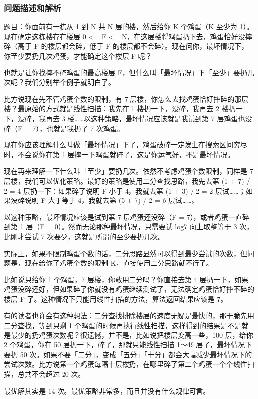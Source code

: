 \documentclass[12pt]{article}
\begin{document}
\subsubsection{问题描述和解析}
题目：你面前有一栋从 1 到 N 共 N 层的楼，然后给你 K 个鸡蛋（K 至少为 1）。现在确定这栋楼存在楼层 0 <= F <= N，在这层楼将鸡蛋扔下去，鸡蛋恰好没摔碎（高于 F 的楼层都会碎，低于 F 的楼层都不会碎）。现在问你，最坏情况下，你至少要扔几次鸡蛋，才能确定这个楼层 F 呢？

也就是让你找摔不碎鸡蛋的最高楼层 F，但什么叫「最坏情况」下「至少」要扔几次呢？我们分别举个例子就明白了。

比方说现在先不管鸡蛋个数的限制，有 7 层楼，你怎么去找鸡蛋恰好摔碎的那层楼？最原始的方式就是线性扫描：我先在 1 楼扔一下，没碎，我再去 2 楼扔一下，没碎，我再去 3 楼……以这种策略，最坏情况应该就是我试到第 7 层鸡蛋也没碎（F = 7），也就是我扔了 7 次鸡蛋。

现在你应该理解什么叫做「最坏情况」下了，鸡蛋破碎一定发生在搜索区间穷尽时，不会说你在第 1 层摔一下鸡蛋就碎了，这是你运气好，不是最坏情况。

现在再来理解一下什么叫「至少」要扔几次。依然不考虑鸡蛋个数限制，同样是 7 层楼，我们可以优化策略。最好的策略是使用二分查找思路，我先去第 (1 + 7) / 2 = 4 层扔一下：如果碎了说明 F 小于 4，我就去第 (1 + 3) / 2 = 2 层试……；如果没碎说明 F 大于等于 4，我就去第 (5 + 7) / 2 = 6 层试……。

以这种策略，最坏情况应该是试到第 7 层鸡蛋还没碎（F = 7），或者鸡蛋一直碎到第 1 层（F = 0）。然而无论那种最坏情况，只需要试 log7 向上取整等于 3 次，比刚才尝试 7 次要少，这就是所谓的至少要扔几次。

实际上，如果不限制鸡蛋个数的话，二分思路显然可以得到最少尝试的次数，但问题是，现在给你了鸡蛋个数的限制 K，直接使用二分思路就不行了。

比如说只给你 1 个鸡蛋，7 层楼，你敢用二分吗？你直接去第 4 层扔一下，如果鸡蛋没碎还好，但如果碎了你就没有鸡蛋继续测试了，无法确定鸡蛋恰好摔不碎的楼层 F 了。这种情况下只能用线性扫描的方法，算法返回结果应该是 7。

有的读者也许会有这种想法：二分查找排除楼层的速度无疑是最快的，那干脆先用二分查找，等到只剩 1 个鸡蛋的时候再执行线性扫描，这样得到的结果是不是就是最少的扔鸡蛋次数呢？很遗憾，并不是，比如说把楼层变高一些，100 层，给你 2 个鸡蛋，你在 50 层扔一下，碎了，那就只能线性扫描 1～49 层了，最坏情况下要扔 50 次。如果不要「二分」，变成「五分」「十分」都会大幅减少最坏情况下的尝试次数。比方说第一个鸡蛋每隔十层楼扔，在哪里碎了第二个鸡蛋一个个线性扫描，总共不会超过 20 次​。

最优解其实是 14 次。最优策略非常多，而且并没有什么规律可言。
\end{document}
